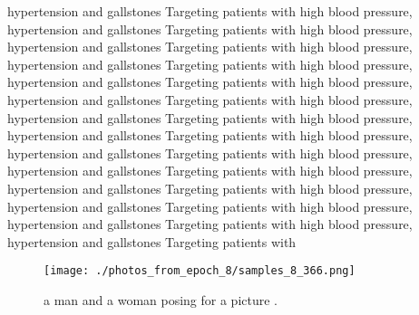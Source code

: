 \documentclass{article}%
\begin{document}
hypertension and gallstones Targeting patients with high blood pressure, hypertension and gallstones Targeting patients with high blood pressure, hypertension and gallstones Targeting patients with high blood pressure, hypertension and gallstones Targeting patients with high blood pressure, hypertension and gallstones Targeting patients with high blood pressure, hypertension and gallstones Targeting patients with high blood pressure, hypertension and gallstones Targeting patients with high blood pressure, hypertension and gallstones Targeting patients with high blood pressure, hypertension and gallstones Targeting patients with high blood pressure, hypertension and gallstones Targeting patients with high blood pressure, hypertension and gallstones Targeting patients with high blood pressure, hypertension and gallstones Targeting patients with high blood pressure, hypertension and gallstones Targeting patients with high blood pressure, hypertension and gallstones Targeting patients with

%


\begin{figure}[h!]%
\centering%
\texttt{[image: ./photos\_from\_epoch\_8/samples\_8\_366.png]}%
\caption{a man and a woman posing for a picture .}%
\end{figure}

%
\end{document}
